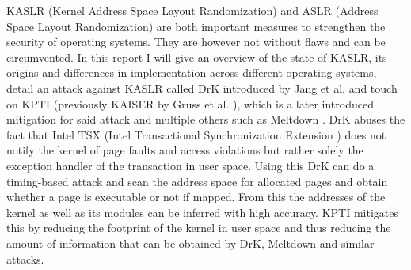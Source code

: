 KASLR (Kernel Address Space Layout Randomization) and ASLR (Address Space Layout Randomization) are both important measures to strengthen the security of operating systems.
They are however not without flaws and can be circumvented.
In this report I will give an overview of the state of KASLR, its origins and differences in implementation across different operating systems, detail an attack against KASLR called DrK introduced by Jang et al. \cite{drk} and touch on KPTI (previously KAISER by Gruss et al. \cite{kaiser}), which is a later introduced mitigation for said attack and multiple others such as Meltdown \cite{meltdown}.
DrK abuses the fact that Intel TSX (Intel Transactional Synchronization Extension \cite{intel-tsx-overview}) does not notify the kernel of page faults and access violations but rather solely the exception handler of the transaction in user space. Using this DrK can do a timing-based attack and scan the address space for allocated pages and obtain whether a page is executable or not if mapped.
From this the addresses of the kernel as well as its modules can be inferred with high accuracy.
KPTI mitigates this by reducing the footprint of the kernel in user space and thus reducing the amount of information that can be obtained by DrK, Meltdown and similar attacks.
